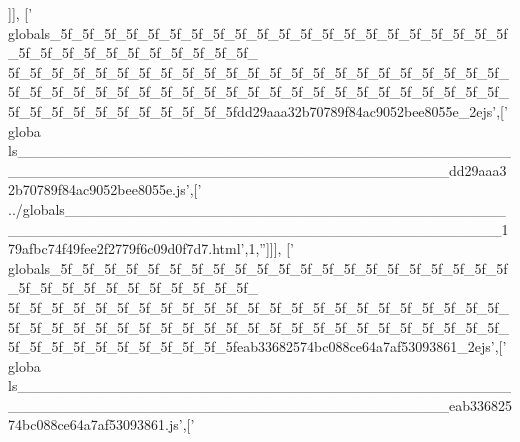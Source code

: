 \begin{DoxyCode}
  [\textcolor{stringliteral}{'
      globals\_5f\_5f\_5f\_5f\_5f\_5f\_5f\_5f\_5f\_5f\_5f\_5f\_5f\_5f\_5f\_5f\_5f\_5f\_5f\_5f\_5f\_5f\_5f\_5f\_5f\_5f\_5f\_5f\_5f\_5f\_5f\_5f\_
      5f\_5f\_5f\_5f\_5f\_5f\_5f\_5f\_5f\_5f\_5f\_5f\_5f\_5f\_5f\_5f\_5f\_5f\_5f\_5f\_5f\_5f\_5f\_5f\_5f\_5f\_5f\_5f\_5f\_5f\_5f\_5f\_5f\_5f\_5f\_5f\_5f\_5f\_5f\_5f\_5f\_5f\_5f\_5f\_5f\_5f\_5f\_5f\_5f\_5f\_5f\_5f\_5f\_5f\_5f\_5f\_5fcca40c4c9c5d646b0091ef4098e5bac8\_2ejs'},[\textcolor{stringliteral}{'
      globa
      ls\_\_\_\_\_\_\_\_\_\_\_\_\_\_\_\_\_\_\_\_\_\_\_\_\_\_\_\_\_\_\_\_\_\_\_\_\_\_\_\_\_\_\_\_\_\_\_\_\_\_\_\_\_\_\_\_\_\_\_\_\_\_\_\_\_\_\_\_\_\_\_\_\_\_\_\_\_\_\_\_\_\_\_\_\_\_\_\_\_cca40c4c9c5d646b0091ef4098e5bac8.js'},[\textcolor{stringliteral}{'
      ../globals\_\_\_\_\_\_\_\_\_\_\_\_\_\_\_\_\_\_\_\_\_\_\_\_\_\_\_\_\_\_\_\_\_\_\_\_\_\_\_\_\_\_\_\_\_\_\_\_\_\_\_\_\_\_\_\_\_\_\_\_\_\_\_\_\_\_\_\_\_\_\_\_\_\_\_\_\_\_\_\_\_\_\_\_\_\_\_\_\_95b7f4876daf21b483d41d9ec11b8fd5.html'},1,\textcolor{stringliteral}{''}]]],
  [\textcolor{stringliteral}{'
      globals\_5f\_5f\_5f\_5f\_5f\_5f\_5f\_5f\_5f\_5f\_5f\_5f\_5f\_5f\_5f\_5f\_5f\_5f\_5f\_5f\_5f\_5f\_5f\_5f\_5f\_5f\_5f\_5f\_5f\_5f\_5f\_5f\_
      5f\_5f\_5f\_5f\_5f\_5f\_5f\_5f\_5f\_5f\_5f\_5f\_5f\_5f\_5f\_5f\_5f\_5f\_5f\_5f\_5f\_5f\_5f\_5f\_5f\_5f\_5f\_5f\_5f\_5f\_5f\_5f\_5f\_5f\_5f\_5f\_5f\_5f\_5f\_5f\_5f\_5f\_5f\_5f\_5f\_5f\_5f\_5f\_5f\_5f\_5f\_5f\_5f\_5f\_5f\_5f\_5fdd29aaa32b70789f84ac9052bee8055e\_2ejs'},[\textcolor{stringliteral}{'
      globa
      ls\_\_\_\_\_\_\_\_\_\_\_\_\_\_\_\_\_\_\_\_\_\_\_\_\_\_\_\_\_\_\_\_\_\_\_\_\_\_\_\_\_\_\_\_\_\_\_\_\_\_\_\_\_\_\_\_\_\_\_\_\_\_\_\_\_\_\_\_\_\_\_\_\_\_\_\_\_\_\_\_\_\_\_\_\_\_\_\_\_dd29aaa32b70789f84ac9052bee8055e.js'},[\textcolor{stringliteral}{'
      ../globals\_\_\_\_\_\_\_\_\_\_\_\_\_\_\_\_\_\_\_\_\_\_\_\_\_\_\_\_\_\_\_\_\_\_\_\_\_\_\_\_\_\_\_\_\_\_\_\_\_\_\_\_\_\_\_\_\_\_\_\_\_\_\_\_\_\_\_\_\_\_\_\_\_\_\_\_\_\_\_\_\_\_\_\_\_\_\_\_\_179afbc74f49fee2f2779f6c09d0f7d7.html'},1,\textcolor{stringliteral}{''}]]],
  [\textcolor{stringliteral}{'
      globals\_5f\_5f\_5f\_5f\_5f\_5f\_5f\_5f\_5f\_5f\_5f\_5f\_5f\_5f\_5f\_5f\_5f\_5f\_5f\_5f\_5f\_5f\_5f\_5f\_5f\_5f\_5f\_5f\_5f\_5f\_5f\_5f\_
      5f\_5f\_5f\_5f\_5f\_5f\_5f\_5f\_5f\_5f\_5f\_5f\_5f\_5f\_5f\_5f\_5f\_5f\_5f\_5f\_5f\_5f\_5f\_5f\_5f\_5f\_5f\_5f\_5f\_5f\_5f\_5f\_5f\_5f\_5f\_5f\_5f\_5f\_5f\_5f\_5f\_5f\_5f\_5f\_5f\_5f\_5f\_5f\_5f\_5f\_5f\_5f\_5f\_5f\_5f\_5f\_5feab33682574bc088ce64a7af53093861\_2ejs'},[\textcolor{stringliteral}{'
      globa
      ls\_\_\_\_\_\_\_\_\_\_\_\_\_\_\_\_\_\_\_\_\_\_\_\_\_\_\_\_\_\_\_\_\_\_\_\_\_\_\_\_\_\_\_\_\_\_\_\_\_\_\_\_\_\_\_\_\_\_\_\_\_\_\_\_\_\_\_\_\_\_\_\_\_\_\_\_\_\_\_\_\_\_\_\_\_\_\_\_\_eab33682574bc088ce64a7af53093861.js'},[\textcolor{stringliteral}{'
}
\end{DoxyCode}
